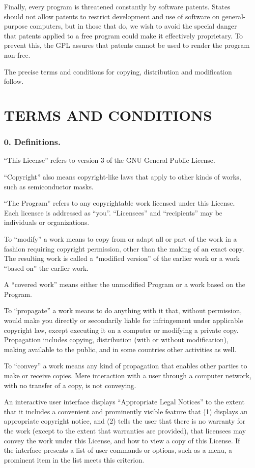 Finally, every program is threatened constantly by software patents. States should not allow patents to restrict development and use of software on general-purpose computers, but in those that do, we wish to avoid the special danger that patents applied to a free program could make it effectively proprietary. To prevent this, the GPL assures that patents cannot be used to render the program non-free.\par
The precise terms and conditions for copying, distribution and modification follow.
\section{TERMS AND CONDITIONS}
\subsubsection{0. Definitions.}
“This License” refers to version 3 of the GNU General Public License.\par
“Copyright” also means copyright-like laws that apply to other kinds of works, such as semiconductor masks.\par
“The Program” refers to any copyrightable work licensed under this License. Each licensee is addressed as “you”. “Licensees” and “recipients” may be individuals or organizations.\par
To “modify” a work means to copy from or adapt all or part of the work in a fashion requiring copyright permission, other than the making of an exact copy. The resulting work is called a “modified version” of the earlier work or a work “based on” the earlier work.\par
A “covered work” means either the unmodified Program or a work based on the Program.\par
To “propagate” a work means to do anything with it that, without permission, would make you directly or secondarily liable for infringement under applicable copyright law, except executing it on a computer or modifying a private copy. Propagation includes copying, distribution (with or without modification), making available to the public, and in some countries other activities as well.\par
To “convey” a work means any kind of propagation that enables other parties to make or receive copies. Mere interaction with a user through a computer network, with no transfer of a copy, is not conveying.\par
An interactive user interface displays “Appropriate Legal Notices” to the extent that it includes a convenient and prominently visible feature that (1) displays an appropriate copyright notice, and (2) tells the user that there is no warranty for the work (except to the extent that warranties are provided), that licensees may convey the work under this License, and how to view a copy of this License. If the interface presents a list of user commands or options, such as a menu, a prominent item in the list meets this criterion.
